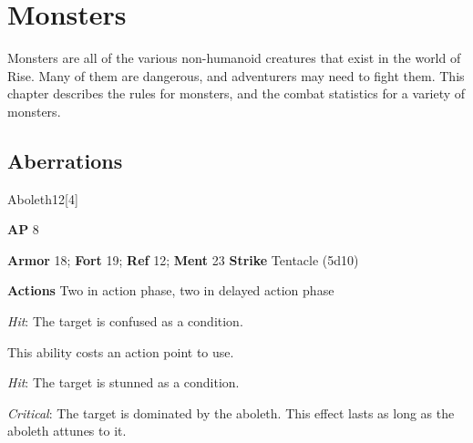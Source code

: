 
\chapter{Monsters}

Monsters are all of the various non-humanoid creatures that exist in the world of Rise.
Many of them are dangerous, and adventurers may need to fight them.
This chapter describes the rules for monsters, and the combat statistics for a variety of monsters.


\section{Aberrations}

\begin{monsection}{Aboleth}{12}[4]
\vspace{-1em}\vspace{-1em}
\begin{spellcontent}
\begin{spelltargetinginfo}
{\textbf{AP} 8}

\pari \textbf{Armor} 18;
\textbf{Fort} 19;
\textbf{Ref} 12;
\textbf{Ment} 23
\pari \textbf{Strike} Tentacle  (5d10)


\pari \textbf{Actions} Two in action phase, two in delayed action phase
\end{spelltargetinginfo}


\begin{spelleffects}

\pari

\par


\par \textit{Hit}: The target is confused as a condition.


\vspace{0.5em}
\pari

\par

This ability costs an action point to use.
\par \textit{Hit}: The target is stunned as a condition.
\par \textit{Critical}:
The target is dominated by the aboleth.
This effect lasts as long as the aboleth attunes to it.



\end{spelleffects}
\end{spellcontent}
\end{monsection}
